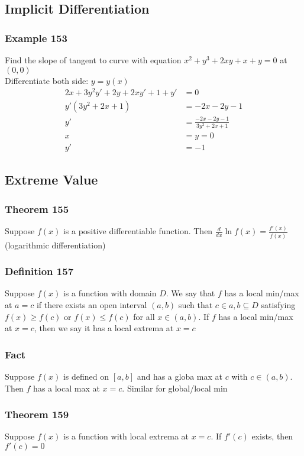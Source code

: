 \documentclass[12pt, letterpaper]{article}
\begin{document}
\subsection{Implicit Differentiation}
\subsubsection*{Example 153}
Find the slope of tangent to curve with equation $x^2 + y^3 + 2xy + x + y = 0$ at $(0,0)$ \\
Differentiate both side: $y=y(x)$
\begin{align*}
    2x + 3y^2y' + 2y + 2xy' + 1 + y' &= 0 \\
    y'(3y^2 + 2x + 1) &= -2x - 2y - 1 \\
    y' &= \frac{-2x - 2y - 1}{3y^2 + 2x + 1} \\
    x &= y = 0 \\
    y' &= -1
\end{align*}
\subsection{Extreme Value}
\subsubsection*{Theorem 155}
Suppose $f(x)$ is a positive differentiable function. Then $\frac{d}{dx}\ln f(x) = \frac{f'(x)}{f(x)}$ (logarithmic differentiation)
\subsubsection*{Definition 157}
Suppose $f(x)$ is a function with domain $D$. We say that $f$ has a local min/max at $a=c$ if there exists 
an open interval $(a,b)$ such that $c\in{a,b}\subseteq D$ satisfying $f(x) \geq f(c)$ or $f(x) \leq f(c)$ for 
all $x\in(a,b)$. If $f$ has a local min/max at $x=c$, then we say it has a local extrema at $x=c$
\subsubsection*{Fact}
Suppose $f(x)$ is defined on $[a,b]$ and has a globa max at $c$ with $c\in(a,b)$. Then $f$ has a local max at $x=c$. 
Similar for global/local min
\subsubsection*{Theorem 159}
Suppose $f(x)$ is a function with local extrema at $x=c$. If $f'(c)$ exists, then $f'(c) = 0$
\end{document}
